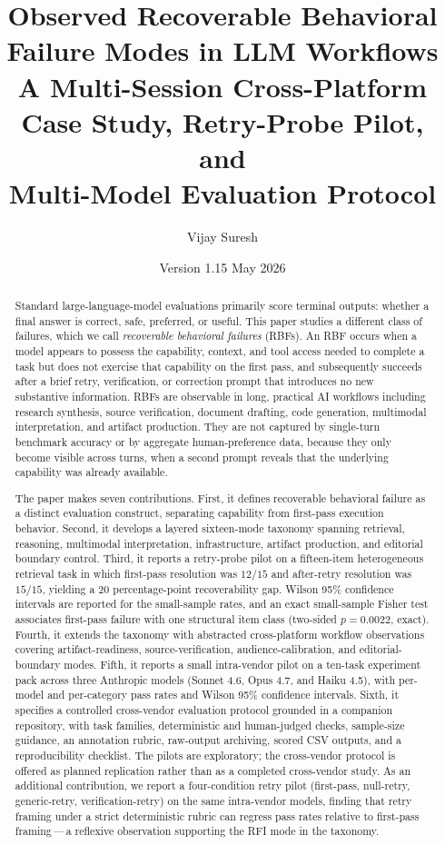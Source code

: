 \documentclass[11pt]{article}
\title{\textbf{Observed Recoverable Behavioral Failure Modes in LLM Workflows}\\
       \large A Multi-Session Cross-Platform Case Study, Retry-Probe Pilot, and\\
       Multi-Model Evaluation Protocol}
\author{Vijay Suresh}
\date{Version 1.15 \quad May 2026}
\begin{document}
\maketitle

\begin{abstract}
Standard large-language-model evaluations primarily score terminal outputs: whether a final answer is correct, safe, preferred, or useful. This paper studies a different class of failures, which we call \emph{recoverable behavioral failures} (RBFs). An RBF occurs when a model appears to possess the capability, context, and tool access needed to complete a task but does not exercise that capability on the first pass, and subsequently succeeds after a brief retry, verification, or correction prompt that introduces no new substantive information. RBFs are observable in long, practical AI workflows including research synthesis, source verification, document drafting, code generation, multimodal interpretation, and artifact production. They are not captured by single-turn benchmark accuracy or by aggregate human-preference data, because they only become visible across turns, when a second prompt reveals that the underlying capability was already available.

The paper makes seven contributions. First, it defines recoverable behavioral failure as a distinct evaluation construct, separating capability from first-pass execution behavior. Second, it develops a layered sixteen-mode taxonomy spanning retrieval, reasoning, multimodal interpretation, infrastructure, artifact production, and editorial boundary control. Third, it reports a retry-probe pilot on a fifteen-item heterogeneous retrieval task in which first-pass resolution was $12/15$ and after-retry resolution was $15/15$, yielding a $20$ percentage-point recoverability gap. Wilson 95\% confidence intervals are reported for the small-sample rates, and an exact small-sample Fisher test associates first-pass failure with one structural item class (two-sided $p = 0.0022$, exact). Fourth, it extends the taxonomy with abstracted cross-platform workflow observations covering artifact-readiness, source-verification, audience-calibration, and editorial-boundary modes. Fifth, it reports a small intra-vendor pilot on a ten-task experiment pack across three Anthropic models (Sonnet 4.6, Opus 4.7, and Haiku 4.5), with per-model and per-category pass rates and Wilson 95\% confidence intervals. Sixth, it specifies a controlled cross-vendor evaluation protocol grounded in a companion repository, with task families, deterministic and human-judged checks, sample-size guidance, an annotation rubric, raw-output archiving, scored CSV outputs, and a reproducibility checklist. The pilots are exploratory; the cross-vendor protocol is offered as planned replication rather than as a completed cross-vendor study.
 As an additional contribution, we report a four-condition retry pilot (first-pass, null-retry, generic-retry, verification-retry) on the same intra-vendor models, finding that retry framing under a strict deterministic rubric can regress pass rates relative to first-pass framing\,---\,a reflexive observation supporting the RFI mode in the taxonomy.
\end{abstract}
\end{document}

